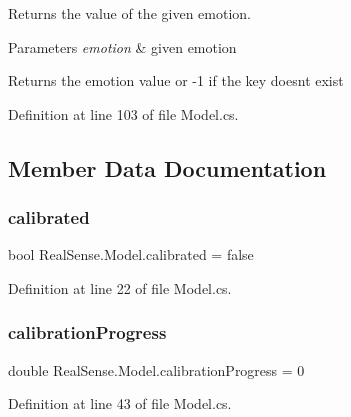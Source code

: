 Returns the value of the given emotion.


\begin{DoxyParams}{Parameters}
{\em emotion} & given emotion \\
\hline
\end{DoxyParams}
\begin{DoxyReturn}{Returns}
the emotion value or -\/1 if the key doesn\textquotesingle{}t exist 
\end{DoxyReturn}


Definition at line 103 of file Model.\+cs.



\subsection{Member Data Documentation}
\mbox{\label{class_real_sense_1_1_model_af0a605c0cc3c8739836a4e98ac06b864}} 
\subsubsection{\texorpdfstring{calibrated}{calibrated}}
{\footnotesize\ttfamily bool Real\+Sense.\+Model.\+calibrated = false\hspace{0.3cm}{\ttfamily [static]}}



Definition at line 22 of file Model.\+cs.

\mbox{\label{class_real_sense_1_1_model_a8573a7d01db1fb8a29f5873a717373bc}} 
\subsubsection{\texorpdfstring{calibration\+Progress}{calibrationProgress}}
{\footnotesize\ttfamily double Real\+Sense.\+Model.\+calibration\+Progress = 0}



Definition at line 43 of file Model.\+cs.

\mbox{\label{class_real_sense_1_1_model_aa6e241f22bac2dbdefdceef6e4cf0202}} 
